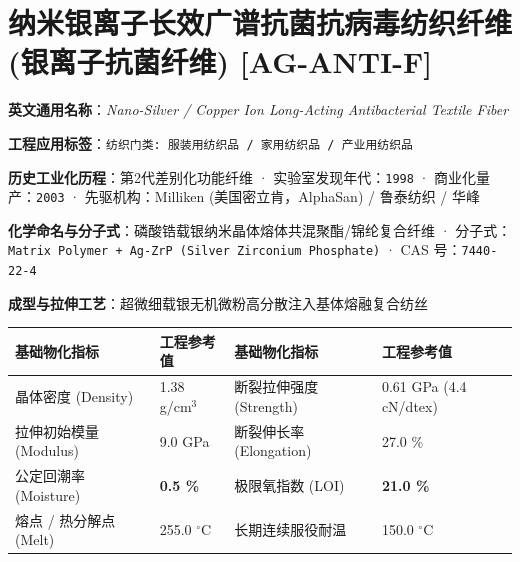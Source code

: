 \documentclass[11pt,openright,twoside,UTF8]{ctexbook}
\begin{document}
\section{纳米银离子长效广谱抗菌抗病毒纺织纤维 (银离子抗菌纤维) [AG-ANTI-F]}
\label{sec:ag-anti-f}

\noindent\textbf{英文通用名称}：\textit{Nano-Silver / Copper Ion Long-Acting Antibacterial Textile Fiber}\par
\noindent\textbf{工程应用标签}：\texttt{纺织门类: 服装用纺织品 / 家用纺织品 / 产业用纺织品}\par
\noindent\textbf{历史工业化历程}：第2代差别化功能纤维 · 实验室发现年代：\texttt{1998} · 商业化量产：\texttt{2003} · 先驱机构：Milliken (美国密立肯，AlphaSan) / 鲁泰纺织 / 华峰\par
\noindent\textbf{化学命名与分子式}：磷酸锆载银纳米晶体熔体共混聚酯/锦纶复合纤维 · 分子式：\texttt{Matrix Polymer + Ag-ZrP (Silver Zirconium Phosphate)} · CAS 号：\texttt{7440-22-4}\par
\noindent\textbf{成型与拉伸工艺}：超微细载银无机微粉高分散注入基体熔融复合纺丝\par

\vspace{0.15cm}
\begin{center}
\small
\begin{tabularx}{\textwidth}{p{3.8cm}Xp{3.8cm}X}
\toprule
\textbf{基础物化指标} & \textbf{工程参考值} & \textbf{基础物化指标} & \textbf{工程参考值} \\
\midrule
晶体密度 (Density) & 1.38 g/cm$^3$ & 断裂拉伸强度 (Strength) & 0.61 GPa (4.4 cN/dtex) \\
拉伸初始模量 (Modulus) & 9.0 GPa & 断裂伸长率 (Elongation) & 27.0 \% \\
公定回潮率 (Moisture) & \textbf{0.5 \%} & 极限氧指数 (LOI) & \textbf{21.0 \%} \\
熔点 / 热分解点 (Melt) & 255.0 $^\circ\mathrm{C}$ & 长期连续服役耐温 & 150.0 $^\circ\mathrm{C}$ \\
\bottomrule
\end{tabularx}
\end{center}
\vspace{0.15cm}
\end{document}
